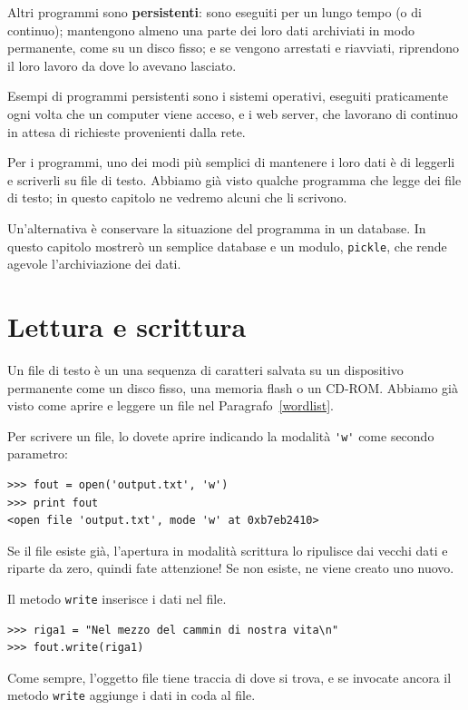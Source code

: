 \documentclass[10pt]{book}
\begin{document}
Altri programmi sono {\bf persistenti}: sono eseguiti per un lungo tempo (o di continuo); mantengono almeno una parte dei loro dati archiviati in modo permanente, come su un disco fisso; e se vengono arrestati e riavviati, riprendono il loro lavoro da dove lo avevano lasciato.

Esempi di programmi persistenti sono i sistemi operativi, eseguiti praticamente ogni volta che un computer viene acceso, e i web server, che lavorano di continuo in attesa di richieste provenienti dalla rete.

Per i programmi, uno dei modi più semplici di mantenere i loro dati è di leggerli e scriverli su file di testo. Abbiamo già visto qualche programma che legge dei file di testo; in questo capitolo ne vedremo alcuni che li scrivono.

Un'alternativa è conservare la situazione del programma in un database. In questo capitolo mostrerò un semplice database e un modulo, {\tt pickle}, che rende agevole l'archiviazione dei dati.


\section{Lettura e scrittura}

Un file di testo è un una sequenza di caratteri salvata su un dispositivo permanente come un disco fisso, una memoria flash o un CD-ROM. Abbiamo già visto come aprire e leggere un file nel Paragrafo~\ref{wordlist}.

Per scrivere un file, lo dovete aprire indicando la modalità \verb"'w'" come secondo parametro:

\begin{verbatim}
>>> fout = open('output.txt', 'w')
>>> print fout
<open file 'output.txt', mode 'w' at 0xb7eb2410>
\end{verbatim}
%
Se il file esiste già, l'apertura in modalità scrittura lo ripulisce dai vecchi dati e riparte da zero, quindi fate attenzione! Se non esiste, ne viene creato uno nuovo.

Il metodo {\tt write} inserisce i dati nel file.

\begin{verbatim}
>>> riga1 = "Nel mezzo del cammin di nostra vita\n"
>>> fout.write(riga1)
\end{verbatim}
%
Come sempre, l'oggetto file tiene traccia di dove si trova, e se invocate ancora il metodo {\tt write} aggiunge i dati in coda al file.
\end{document}
